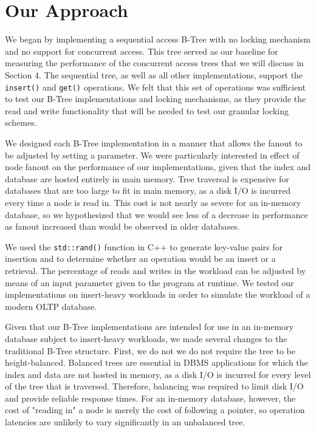 \documentclass{sig-alternate}
\begin{document}
\section{Our Approach}
We began by implementing a sequential access B-Tree with no locking mechanism and no support for concurrent access. This tree served as our baseline for measuring the performance of the concurrent access trees that we will discuss in Section 4. The sequential tree, as well as all other implementations, support the \texttt{insert()} and \texttt{get()} operations. We felt that this set of operations was sufficient to test our B-Tree implementations and locking mechanisms, as they provide the read and write functionality that will be needed to test our granular locking schemes.

We designed each B-Tree implementation in a manner that allows the fanout to be adjusted by setting a parameter. We were particularly interested in effect of node fanout on the performance of our implementations, given that the index and database are hosted entirely in main memory. Tree traversal is expensive for databases that are too large to fit in main memory, as a disk I/O is incurred every time a node is read in. This cost is not nearly as severe for an in-memory database, so we hypothesized that we would see less of a decrease in performance as fanout increased than would be observed in older databases.

We used the \texttt{std::rand()} function in C++ to generate key-value pairs for insertion and to determine whether an operation would be an insert or a retrieval. The percentage of reads and writes in the workload can be adjusted by means of an input parameter given to the program at runtime. We tested our implementations on insert-heavy workloads in order to simulate the workload of a modern OLTP database.

Given that our B-Tree implementations are intended for use in an in-memory database subject to insert-heavy workloads, we made several changes to the traditional B-Tree structure.  First, we do not we do not require the tree to be height-balanced.  Balanced trees are essential in DBMS applications for which the index and data are not hosted in memory, as a disk I/O is incurred for every level of the tree that is traversed. Therefore, balancing was required to limit disk I/O and provide reliable response times. For an in-memory database, however, the cost of "reading in" a node is merely the cost of following a pointer, so operation latencies are unlikely to vary significantly in an unbalanced tree. 
\end{document}
